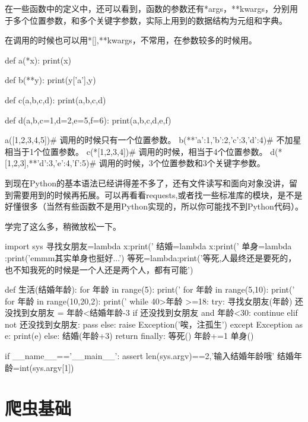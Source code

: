 \documentclass[11pt,UTF8,oneside]{mybook}
\begin{document}
在一些函数中的定义中，还可以看到，函数的参数还有*args，**kwargs，分别用于多个位置参数，和多个关键字参数，实际上用到的数据结构为元组和字典。

在调用的时候也可以用*[],**kwargs，不常用，在参数较多的时候用。

\begin{python}
def a(*x):
    print(x)

def b(**y):
    print(y['a'],y)

def c(a,b,c,d):
    print(a,b,c,d)

def d(a,b,c=1,d=2,e=5,f=6):
    print(a,b,c,d,e,f)

a([1,2,3,4,5])# 调用的时候只有一个位置参数。
b(**{'a':1,'b':2,'c':3,'d':4})# 不加星相当于1个位置参数。
c(*[1,2,3,4])# 调用的时候，相当于4个位置参数。
d(*[1,2,3],**{'d':3,'e':4,'f':5})# 调用的时候，3个位置参数和3个关键字参数。
\end{python}

到现在Python的基本语法已经讲得差不多了，还有文件读写和面向对象没讲，留到需要用到的时候再拓展。可以再看看requests,或者找一些标准库的模块，是不是好懂很多（当然有些函数不是用Python实现的，所以你可能找不到Python代码）。

学完了这么多，稍微放松一下。

\begin{python}
import sys
寻找女朋友=lambda x:print('%
结婚=lambda x:print('%
单身=lambda :print('emmm其实单身也挺好...')
等死=lambda:print('等死,人最终还是要死的，也不知我死的时候是一个人还是两个人，都有可能')

def 生活(结婚年龄):
    for 年龄 in range(5):
        print('%
    for 年龄 in range(5,10):
        print('%
    for 年龄 in range(10,20,2):
        print('%
    while 40>年龄 >=18:
        try:
            寻找女朋友(年龄)
            还没找到女朋友 = 年龄<结婚年龄-3
            if 还没找到女朋友 and 年龄<30:
                continue
            elif not 还没找到女朋友:
                pass
            else:
                raise Exception('唉，注孤生')
        except Exception as e:
            print(e)
        else:
            结婚(年龄+3)
            return
        finally:
            等死()
            年龄+=1
    单身()

if __name__=='__main__':
    assert len(sys.argv)==2,'输入结婚年龄哦'
    结婚年龄=int(sys.argv[1])

\end{python}


\chapter{爬虫基础}
\label{chap:spider_foundation}
\end{document}
